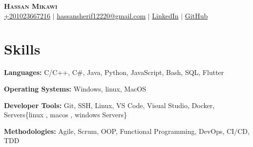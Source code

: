 \documentclass[letterpaper,10.5pt]{article}
\newcommand{\resumeSubHeadingListStart}{\begin{itemize}[leftmargin=0.15in, label={}]}
\newcommand{\resumeSubHeadingListEnd}{\end{itemize}}
\begin{document}

\begin{center}
    \textbf{\Huge \scshape Hassan Mikawi} \\ \vspace{5pt}
    \small
    \hspace{.5pt} \href{tel:+201023667216}{+201023667216}
    $|$
    \hspace{.5pt} \href{mailto:hassansherif12220@gmail.com}{hassansherif12220@gmail.com}
    $|$
    \hspace{.5pt} \href{https://www.linkedin.com/in/mikawi/}{LinkedIn}
    $|$
    \hspace{.5pt} \href{https://github.com/Hassan220022}{GitHub}
\end{center}




\section{Skills}
  \vspace{2pt}
  \resumeSubHeadingListStart
    \small{\item{
        
        \textbf{Languages:}{ C/C++, C\#, Java, Python, JavaScript, Bash, SQL, Flutter} \\ \vspace{3pt}

        \textbf{Operating Systems:}{ Windows, linux, MacOS} \\ \vspace{3pt}
        
        \textbf{Developer Tools:}{ Git, SSH, Linux, VS Code, Visual Studio, Docker, Servers\{linux , macos , windows Servers\}} \\ \vspace{3pt}
        
        \textbf{Methodologies:}{ Agile, Scrum, OOP, Functional Programming, DevOps, CI/CD, TDD} \\ \vspace{3pt}
        
    }}
  \resumeSubHeadingListEnd
\end{document}
